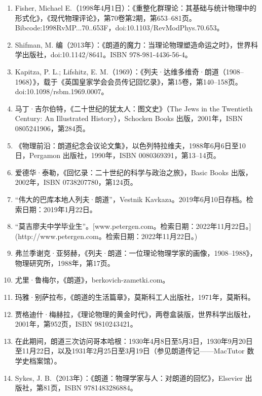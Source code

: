 \begin{enumerate}
\item Fisher, Michael E.（1998年4月1日）：《重整化群理论：其基础与统计物理中的形式化》，《现代物理评论》，第70卷第2期，第653–681页。Bibcode:1998RvMP...70..653F，doi:10.1103/RevModPhys.70.653。
\item Shifman, M. 编（2013年）：《朗道的魔力：当理论物理塑造命运之时》，世界科学出版社，doi:10.1142/8641。ISBN 978-981-4436-56-4。
\item Kapitza, P. L.; Lifshitz, E. M.（1969）：《列夫·达维多维奇·朗道（1908–1968）》，载于《英国皇家学会会员传记回忆录》，第15卷，第140–158页。doi:10.1098/rsbm.1969.0007。
\item 马丁·吉尔伯特，《二十世纪的犹太人：图文史》（The Jews in the Twentieth Century: An Illustrated History），Schocken Books 出版，2001年，ISBN 0805241906，第284页。
\item 《物理前沿：朗道纪念会议论文集》，以色列特拉维夫，1988年6月6日至10日，Pergamon 出版社，1990年，ISBN 0080369391，第13–14页。
\item 爱德华·泰勒，《回忆录：二十世纪的科学与政治之旅》，Basic Books 出版，2002年，ISBN 0738207780，第124页。
\item “伟大的巴库本地人列夫·朗道”，Vestnik Kavkaza。2019年6月10日存档。检索日期：2019年1月22日。
\item “莫吉廖夫中学毕业生”。[www.petergen.com。检索日期：2022年11月22日。](http://www.petergen.com。检索日期：2022年11月22日。)
\item 弗兰季谢克·亚努赫，《列夫·朗道：一位理论物理学家的画像，1908–1988》，物理研究所，1988年，第17页。
\item 尤里·鲁梅尔，《朗道》，berkovich-zametki.com。
\item 玛雅·别萨拉布，《朗道的生活篇章》，莫斯科工人出版社，1971年，莫斯科。
\item 贾格迪什·梅赫拉，《理论物理的黄金时代》，两卷盒装版，世界科学出版社，2001年，第952页，ISBN 9810243421。
\item 在此期间，朗道三次访问哥本哈根：1930年4月8日至5月3日，1930年9月20日至11月22日，以及1931年2月25日至3月19日（参见朗道传记——MacTutor 数学史档案馆）。
\item Sykes, J. B.（2013年）：《朗道：物理学家与人：对朗道的回忆》，Elsevier 出版社，第81页，ISBN 9781483286884。


\end{enumerate}